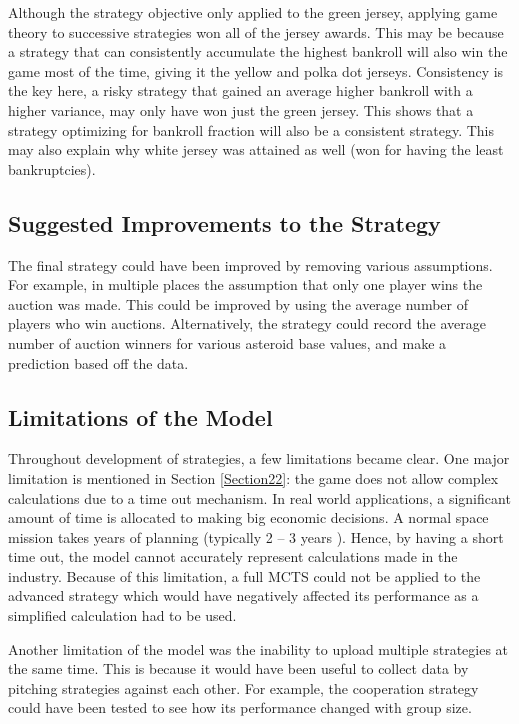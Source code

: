 \documentclass[11pt, twoside]{article}
\begin{document}
Although the strategy objective only applied to the green jersey, applying game theory to successive strategies won all of the jersey awards. This may be because a strategy that can consistently accumulate the highest bankroll will also win the game most of the time, giving it the yellow and polka dot jerseys. Consistency is the key here, a risky strategy that gained an average higher bankroll with a higher variance, may only have won just the green jersey. This shows that a strategy optimizing for bankroll fraction will also be a consistent strategy. This may also explain why white jersey was attained as well (won for having the least bankruptcies).

\subsection{Suggested Improvements to the Strategy}
The final strategy could have been improved by removing various assumptions. For example, in multiple places the assumption that only one player wins the auction was made. This could be improved by using the average number of players who win auctions. Alternatively, the strategy could record the average number of auction winners for various asteroid base values, and make a prediction based off the data.

\subsection{Limitations of the Model}
Throughout development of strategies, a few limitations became clear. One major limitation is mentioned in Section \ref{Section22}: the game does not allow complex calculations due to a time out mechanism. In real world applications, a significant amount of time is allocated to making big economic decisions. A normal space mission takes years of planning (typically 2 -- 3 years \cite{davis2015long}). Hence, by having a short time out, the model cannot accurately represent calculations made in the industry. Because of this limitation, a full MCTS could not be applied to the advanced strategy which would have negatively affected its performance as a simplified calculation had to be used.

Another limitation of the model was the inability to upload multiple strategies at the same time. This is because it would have been useful to collect data by pitching strategies against each other. For example, the cooperation strategy could have been tested to see how its performance changed with group size.
\end{document}
